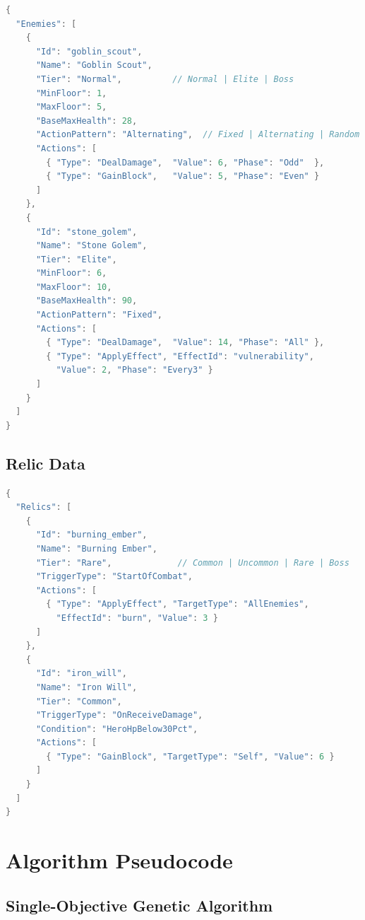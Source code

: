 \begin{lstlisting}[language=C, caption={EnemyData JSON schema and example entries}]
{
  "Enemies": [
    {
      "Id": "goblin_scout",
      "Name": "Goblin Scout",
      "Tier": "Normal",          // Normal | Elite | Boss
      "MinFloor": 1,
      "MaxFloor": 5,
      "BaseMaxHealth": 28,
      "ActionPattern": "Alternating",  // Fixed | Alternating | Random
      "Actions": [
        { "Type": "DealDamage",  "Value": 6, "Phase": "Odd"  },
        { "Type": "GainBlock",   "Value": 5, "Phase": "Even" }
      ]
    },
    {
      "Id": "stone_golem",
      "Name": "Stone Golem",
      "Tier": "Elite",
      "MinFloor": 6,
      "MaxFloor": 10,
      "BaseMaxHealth": 90,
      "ActionPattern": "Fixed",
      "Actions": [
        { "Type": "DealDamage",  "Value": 14, "Phase": "All" },
        { "Type": "ApplyEffect", "EffectId": "vulnerability",
          "Value": 2, "Phase": "Every3" }
      ]
    }
  ]
}
\end{lstlisting}

\subsection*{Relic Data}

\begin{lstlisting}[language=C, caption={RelicData JSON schema and example entry}]
{
  "Relics": [
    {
      "Id": "burning_ember",
      "Name": "Burning Ember",
      "Tier": "Rare",             // Common | Uncommon | Rare | Boss
      "TriggerType": "StartOfCombat",
      "Actions": [
        { "Type": "ApplyEffect", "TargetType": "AllEnemies",
          "EffectId": "burn", "Value": 3 }
      ]
    },
    {
      "Id": "iron_will",
      "Name": "Iron Will",
      "Tier": "Common",
      "TriggerType": "OnReceiveDamage",
      "Condition": "HeroHpBelow30Pct",
      "Actions": [
        { "Type": "GainBlock", "TargetType": "Self", "Value": 6 }
      ]
    }
  ]
}
\end{lstlisting}

\section*{Algorithm Pseudocode}
\label{app:pseudocode}

\subsection*{Single-Objective Genetic Algorithm}

